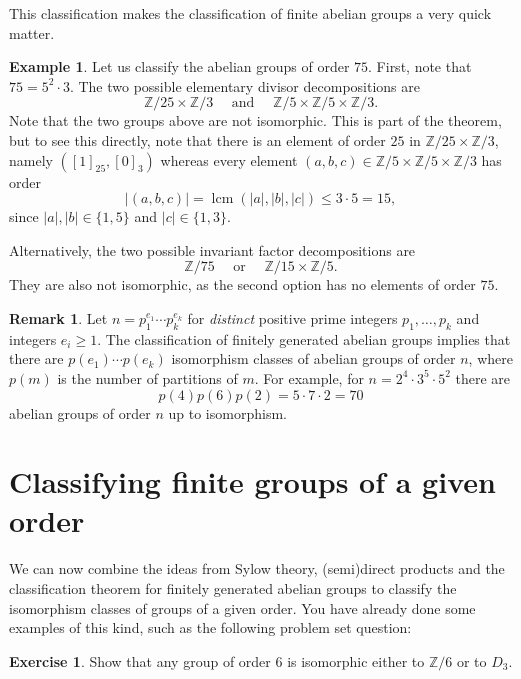 \documentclass[12pt]{report}
\numberwithin{equation}{section}
\numberwithin{theorem}{chapter}
\theoremstyle{definition}
\newtheorem{example}[theorem]{Example}
\newtheorem{exercise}{Exercise}
\newtheorem*{basic properties}{Basic Properties}
\newtheorem*{Important Remark}{Important Remark}
\newtheorem{remark}[theorem]{Remark}
\DeclareMathOperator{\lcm}{lcm}
\begin{document}
This classification makes the classification of finite abelian groups a very quick matter.


\begin{example}
Let us classify the abelian groups of order $75$. First, note that $75 = 5^2 \cdot 3$. The two possible elementary divisor decompositions are 
$$\mathbb{Z}/25 \times \mathbb{Z}/3 \quad \text{ and } \quad \mathbb{Z}/5 \times \mathbb{Z}/5 \times \mathbb{Z}/3.$$
Note that the two groups above are not isomorphic. This is part of the theorem, but to see this directly, note that there is an element of order $25$ in $\mathbb{Z}/25 \times \mathbb{Z}/3$, namely $([1]_{25},[0]_3)$ whereas every element $(a,b,c)\in \mathbb{Z}/5 \times \mathbb{Z}/5 \times \mathbb{Z}/3$ has order 
$$|(a,b,c)| =\lcm(|a|, |b|, |c|)\leqslant 3 \cdot 5 = 15,$$
since $|a|, |b| \in \{1,5\}$ and $|c| \in \{1,3\}$.

Alternatively, the two possible invariant factor decompositions are
$$\mathbb{Z}/75 \quad \text{ or } \quad \mathbb{Z}/15 \times \mathbb{Z}/5.$$
They are also not isomorphic, as the second option has no elements of order $75$.
\end{example}



\begin{remark} 
Let $n = p_1^{e_1} \cdots p_k^{e_k}$ for {\em distinct} positive prime integers $p_1, \dots, p_k$ and integers $e_i \geqslant 1$. The classification of finitely generated abelian groups implies that there are $p(e_1) \cdots p(e_k)$ isomorphism classes of abelian groups of order $n$, where $p(m)$ is the number of partitions of $m$. For example, for $n = 2^4 \cdot 3^5 \cdot 5^2$ there are 
$$p(4) p(6) p(2) = 5 \cdot 7 \cdot 2 = 70$$ 
abelian groups of order $n$ up to isomorphism.	
\end{remark}



\section{Classifying finite groups of a given order}

We can now combine the ideas from Sylow theory, (semi)direct products and the classification theorem for finitely generated abelian groups to classify the isomorphism classes of groups of a given order.
You have already done some examples of this kind, such as the following problem set question:

\begin{exercise}
Show that any group of order $6$ is isomorphic either to $\mathbb{Z}/6$ or to $D_3$.
\end{exercise}
\end{document}
